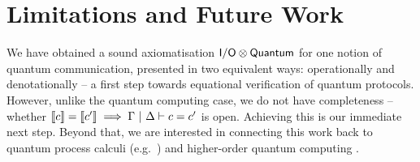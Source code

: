 \documentclass[sigplan, nonacm]{acmart}
\begin{document}
\section{Limitations and Future Work}

We have obtained a sound axiomatisation $\mathsf{I/O} \otimes \mathsf{Quantum}$ for one notion of quantum communication, presented in two equivalent ways: operationally and denotationally -- a first step towards equational verification of quantum protocols. However, unlike the quantum computing case, we do not have completeness -- whether $\llbracket c\rrbracket=\llbracket c'\rrbracket \implies \Gamma \ | \ \Delta \vdash c = c'$ is open. Achieving this is our immediate next step. Beyond that, we are interested in connecting this work back to quantum process calculi (e.g.~\cite{lqCCS_10.1145/3632885}) and higher-order quantum computing \cite{PaganiSV13,kissinger2019categorical}. 



\end{document}
